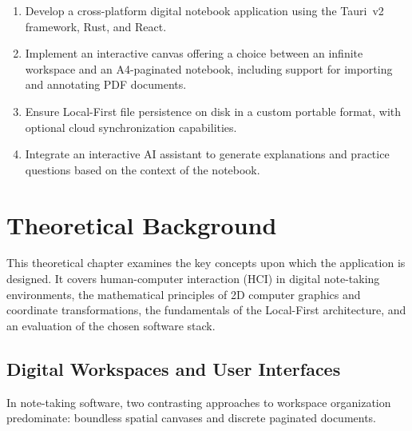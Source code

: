 \documentclass[12pt, a4paper, oneside]{article}
\begin{document}
\begin{enumerate}
    \item Develop a cross-platform digital notebook application using the Tauri~v2 framework, Rust, and React.
    \item Implement an interactive canvas offering a choice between an infinite workspace and an A4-paginated notebook, including support for importing and annotating PDF documents.
    \item Ensure Local-First file persistence on disk in a custom portable format, with optional cloud synchronization capabilities.
    \item Integrate an interactive AI assistant to generate explanations and practice questions based on the context of the notebook.
\end{enumerate}


\section{Theoretical Background}
\label{sec:teoreticka_cast}

This theoretical chapter examines the key concepts upon which the application is designed. It covers human-computer interaction (HCI) in digital note-taking environments, the mathematical principles of 2D computer graphics and coordinate transformations, the fundamentals of the Local-First architecture, and an evaluation of the chosen software stack.

\subsection{Digital Workspaces and User Interfaces}
\label{sec:teorie_zui}

In note-taking software, two contrasting approaches to workspace organization predominate: boundless spatial canvases and discrete paginated documents.
\end{document}
